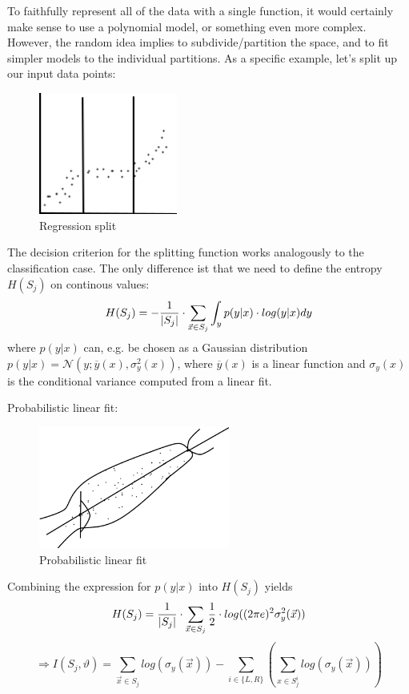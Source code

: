 \documentclass{scrartcl}
\DeclarePairedDelimiter\abs{\lvert}{\rvert}%
\begin{document}
To faithfully represent all of the data with a single function, it would certainly make sense to use a polynomial model, or something even more complex. However, the random idea implies to subdivide/partition the space, and to fit simpler models to the individual partitions. As a specific example, let's split up our input data points:

\begin{figure}[ht]
	\centering
    \includegraphics[height=4cm]{img/rf_regression.jpg}
	\caption{Regression split}
	\label{fig:rf_regression}
\end{figure}

The decision criterion for the splitting function works analogously to the classification case. The only difference ist that we need to define the entropy \(H(S_j)\) on continous values:
\[H(S_j) = -\frac{1}{\abs{S_j}} \cdot \sum_{\vec{x} \in S_j} \int_y p(y|x) \cdot log(y|x)dy\]
where \(p(y|x)\) can, e.g. be chosen as a Gaussian distribution \(p(y|x) = \mathcal{N}(y; \overline{y}(x), \sigma_y^2(x))\), where \(\overline{y}(x)\) is a linear function and \(\sigma_y(x)\) is the conditional variance computed from a linear fit.

Probabilistic linear fit:
\begin{figure}[H]
	\centering
    \includegraphics[height=4cm]{img/rf_linearfit.jpg}
    \caption{Probabilistic linear fit}
	\label{fig:rf_regression}
\end{figure}

Combining the expression for \(p(y|x)\) into \(H(S_j)\) yields
\[H(S_j) = \frac{1}{\abs{S_j}} \cdot \sum_{\vec{x} \in S_j} \frac{1}{2} \cdot log((2 \pi e)^2 \sigma_y^2(\vec{x}))\]
\[\Rightarrow I(S_j, \vartheta) = \sum_{\vec{x} \in S_j} log(\sigma_y(\vec{x})) - \sum_{i \in \{L, R\}} (\sum_{x \in S_j^i} log (\sigma_y(\vec{x}))) \]
\end{document}
